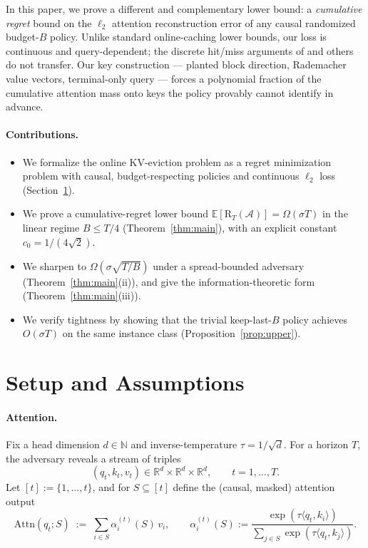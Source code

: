 \documentclass{article}
\theoremstyle{definition}
\theoremstyle{remark}
\newcommand{\R}{\mathbb{R}}
\newcommand{\N}{\mathbb{N}}
\newcommand{\E}{\mathbb{E}}
\newcommand{\A}{\mathcal{A}}
\newcommand{\Reg}{\mathrm{R}}
\newcommand{\Attn}{\mathrm{Attn}}
\newcommand{\inner}[2]{\langle #1, #2 \rangle}
\begin{document}
In this paper, we prove a different and complementary lower bound: a \emph{cumulative regret} bound on the $\ell_2$ attention reconstruction error of any causal randomized budget-$B$ policy. Unlike standard online-caching lower bounds, our loss is continuous and query-dependent; the discrete hit/miss arguments of \citet{bhattacharjee2020online} and others do not transfer. Our key construction --- planted block direction, Rademacher value vectors, terminal-only query --- forces a polynomial fraction of the cumulative attention mass onto keys the policy provably cannot identify in advance.

\paragraph{Contributions.}
\begin{itemize}
\item We formalize the online KV-eviction problem as a regret minimization problem with causal, budget-respecting policies and continuous $\ell_2$ loss (Section~\ref{sec:setup}).
\item We prove a cumulative-regret lower bound $\E[\Reg_T(\A)]=\Omega(\sigma T)$ in the linear regime $B\le T/4$ (Theorem~\ref{thm:main}), with an explicit constant $c_0=1/(4\sqrt 2)$.
\item We sharpen to $\Omega(\sigma\sqrt{T/B})$ under a spread-bounded adversary (Theorem~\ref{thm:main}(ii)), and give the information-theoretic form (Theorem~\ref{thm:main}(iii)).
\item We verify tightness by showing that the trivial keep-last-$B$ policy achieves $O(\sigma T)$ on the same instance class (Proposition~\ref{prop:upper}).
\end{itemize}

\section{Setup and Assumptions}
\label{sec:setup}

\paragraph{Attention.}
Fix a head dimension $d\in\N$ and inverse-temperature $\tau=1/\sqrt d$. For a horizon $T$, the adversary reveals a stream of triples
\[
(q_t,k_t,v_t)\in\R^d\times\R^d\times\R^d,\qquad t=1,\dots,T.
\]
Let $[t]:=\{1,\dots,t\}$, and for $S\subseteq[t]$ define the (causal, masked) attention output
\begin{equation}
\Attn(q_t;S) \;:=\; \sum_{i\in S}\alpha_i^{(t)}(S)\,v_i,\qquad
\alpha_i^{(t)}(S):=\frac{\exp(\tau\inner{q_t}{k_i})}{\sum_{j\in S}\exp(\tau\inner{q_t}{k_j})}.
\end{equation}
\end{document}
